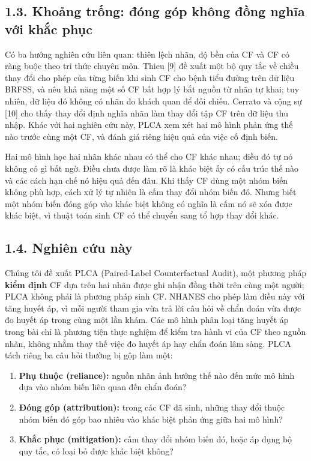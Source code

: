 \documentclass[9pt,a4paper]{extarticle}
\providecommand{\tightlist}{\setlength{\itemsep}{0pt}\setlength{\parskip}{0pt}}
\begin{document}
\subsection{1.3. Khoảng trống: đóng góp không đồng nghĩa với khắc phục}

Có ba hướng nghiên cứu liên quan: thiên lệch nhãn, độ bền của CF và CF
có ràng buộc theo tri thức chuyên môn. Thieu {[}9{]} đề xuất một bộ quy
tắc về chiều thay đổi cho phép của từng biến khi sinh CF cho bệnh tiểu
đường trên dữ liệu BRFSS, và nêu khả năng một số CF bất hợp lý bắt nguồn
từ nhãn tự khai; tuy nhiên, dữ liệu đó không có nhãn đo khách quan để
đối chiếu. Cerrato và cộng sự {[}10{]} cho thấy thay đổi định nghĩa nhãn
làm thay đổi tập CF trên dữ liệu thu nhập. Khác với hai nghiên cứu này,
PLCA xem xét hai mô hình phản ứng thế nào trước cùng một CF, và đánh giá
riêng hiệu quả của việc cố định biến.

Hai mô hình học hai nhãn khác nhau có thể cho CF khác nhau; điều đó tự
nó không có gì bất ngờ. Điều chưa được làm rõ là khác biệt ấy có cấu
trúc thế nào và các cách hạn chế nó hiệu quả đến đâu. Khi thấy CF dùng
một nhóm biến không phù hợp, cách xử lý tự nhiên là cấm thay đổi nhóm
biến đó. Nhưng biết một nhóm biến đóng góp vào khác biệt không có nghĩa
là cấm nó sẽ xóa được khác biệt, vì thuật toán sinh CF có thể chuyển
sang tổ hợp thay đổi khác.

\subsection{1.4. Nghiên cứu này}

Chúng tôi đề xuất PLCA (Paired-Label Counterfactual Audit), một phương
pháp \textbf{kiểm định} CF dựa trên hai nhãn được ghi nhận đồng thời
trên cùng một người; PLCA không phải là phương pháp sinh CF. NHANES cho
phép làm điều này với tăng huyết áp, vì mỗi người tham gia vừa trả lời
câu hỏi về chẩn đoán vừa được đo huyết áp trong cùng một lần khám. Các
mô hình phân loại tăng huyết áp trong bài chỉ là phương tiện thực nghiệm
để kiểm tra hành vi của CF theo nguồn nhãn, không nhằm thay thế việc đo
huyết áp hay chẩn đoán lâm sàng. PLCA tách riêng ba câu hỏi thường bị
gộp làm một:

\begin{enumerate}
\def\labelenumi{\arabic{enumi}.}
\tightlist
\item
  \textbf{Phụ thuộc (reliance):} nguồn nhãn ảnh hưởng thế nào đến mức mô
  hình dựa vào nhóm biến liên quan đến chẩn đoán?
\item
  \textbf{Đóng góp (attribution):} trong các CF đã sinh, những thay đổi
  thuộc nhóm biến đó góp bao nhiêu vào khác biệt phản ứng giữa hai mô
  hình?
\item
  \textbf{Khắc phục (mitigation):} cấm thay đổi nhóm biến đó, hoặc áp
  dụng bộ quy tắc, có loại bỏ được khác biệt không?
\end{enumerate}
\end{document}
